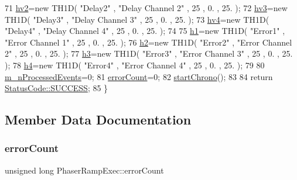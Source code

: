 \begin{DoxyCode}
71   \hyperlink{classPhaserRampExec_a9762fd546432b5f3dffc4c5323af56ac}{hv2}=\textcolor{keyword}{new} TH1D( \textcolor{stringliteral}{"Delay2"} , \textcolor{stringliteral}{"Delay Channel 2"} , 25 , 0. , 25. );
72   \hyperlink{classPhaserRampExec_ad3127f38a360044f7ad8fed272f916f9}{hv3}=\textcolor{keyword}{new} TH1D( \textcolor{stringliteral}{"Delay3"} , \textcolor{stringliteral}{"Delay Channel 3"} , 25 , 0. , 25. );
73   \hyperlink{classPhaserRampExec_a998b7e5a8d186df60c2d60cba2b43aa0}{hv4}=\textcolor{keyword}{new} TH1D( \textcolor{stringliteral}{"Delay4"} , \textcolor{stringliteral}{"Delay Channel 4"} , 25 , 0. , 25. );
74 
75   \hyperlink{classPhaserRampExec_a8c13c96564df17be4e71685684e67edd}{h1}=\textcolor{keyword}{new} TH1D( \textcolor{stringliteral}{"Error1"} , \textcolor{stringliteral}{"Error Channel 1"} , 25 , 0. , 25. );
76   \hyperlink{classPhaserRampExec_a538d1b02ed14d13c71f54b2b48e765ba}{h2}=\textcolor{keyword}{new} TH1D( \textcolor{stringliteral}{"Error2"} , \textcolor{stringliteral}{"Error Channel 2"} , 25 , 0. , 25. );
77   \hyperlink{classPhaserRampExec_ad9ec4185f676732648c4886f28c9c6b7}{h3}=\textcolor{keyword}{new} TH1D( \textcolor{stringliteral}{"Error3"} , \textcolor{stringliteral}{"Error Channel 3"} , 25 , 0. , 25. );
78   \hyperlink{classPhaserRampExec_aa487df389ad66093dba562f27f558128}{h4}=\textcolor{keyword}{new} TH1D( \textcolor{stringliteral}{"Error4"} , \textcolor{stringliteral}{"Error Channel 4"} , 25 , 0. , 25. );
79   
80   \hyperlink{classPhaserRampExec_a198ba1ebb9a1b0fb2c599405307e92af}{m\_nProcessedEvents}=0;
81   \hyperlink{classPhaserRampExec_a3f09b8bf4cd8f5425adf8ae168d39e50}{errorCount}=0;
82   \hyperlink{classProcessus_a5e4d34b86241fa0756e07375a14ff4b2}{startChrono}();
83   
84   \textcolor{keywordflow}{return} \hyperlink{classStatusCode_a6f565cbeadc76d14c72f047e5e85eb4badd0da38d3ba0d922efd1f4619bc37ad8}{StatusCode::SUCCESS};  
85 \}
\end{DoxyCode}


\subsection{Member Data Documentation}
\mbox{\label{classPhaserRampExec_a3f09b8bf4cd8f5425adf8ae168d39e50}} 
\subsubsection{\texorpdfstring{error\+Count}{errorCount}}
{\footnotesize\ttfamily unsigned long Phaser\+Ramp\+Exec\+::error\+Count\hspace{0.3cm}{\ttfamily [private]}}



